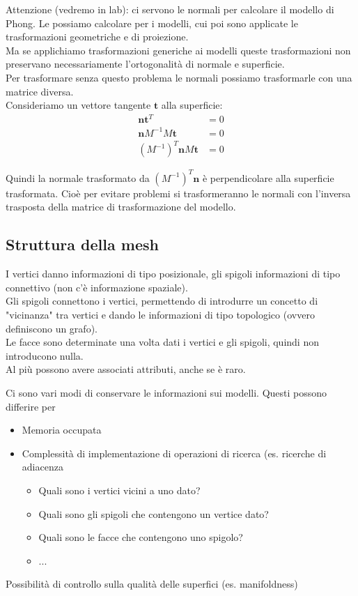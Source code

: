 \documentclass[a4paper, 10pt]{article}
\renewcommand{\vec}{\bm}
\begin{document}
		Attenzione (vedremo in lab): ci servono le normali per
		calcolare il modello di Phong. Le possiamo calcolare per i
		modelli, cui poi sono applicate le trasformazioni geometriche e
		di proiezione.\\
		Ma se applichiamo trasformazioni generiche ai modelli queste
		trasformazioni non preservano necessariamente l'ortogonalità
		di normale e superficie.\\
		Per trasformare senza questo problema le normali possiamo
		trasformarle con una matrice diversa.\\
		Consideriamo un vettore tangente $ \vec{t} $ alla superficie:
		\begin{align*}
			\vec{n}\vec{t}^T &= 0 \\
			\vec{n} M^{-1} M\vec{t} &= 0 \\
			(M^{-1})^T \vec{n} M\vec{t} &= 0
		\end{align*}
		
		Quindi la normale trasformato da $ (M^{-1})^T\vec{n} $ è perpendicolare alla
		superficie trasformata. Cioè per evitare problemi si
		trasformeranno le normali con l'inversa trasposta della matrice
		di trasformazione del modello.
		
	\subsection{Struttura della mesh}
		I vertici danno informazioni di tipo posizionale, gli spigoli
		informazioni di tipo connettivo (non c'è informazione spaziale).\\
		Gli spigoli connettono i vertici, permettendo di introdurre un
		concetto di "vicinanza" tra vertici e dando le informazioni di
		tipo topologico (ovvero definiscono un grafo).\\
		Le facce sono determinate una volta dati i vertici e gli spigoli,
		quindi non introducono nulla.\\
		Al più possono avere associati attributi, anche se è raro.\\
		
		\bigskip
		
		Ci sono vari modi di conservare le informazioni sui modelli.
		Questi possono differire per
		\begin{itemize}
			\item Memoria occupata
			\item Complessità di implementazione di operazioni di ricerca (es. ricerche
			di adiacenza
			\begin{itemize}
				\item Quali sono i vertici vicini a uno dato?
				\item Quali sono gli spigoli che contengono un vertice dato?
				\item Quali sono le facce che contengono uno spigolo?
				\item ...
			\end{itemize}
		\end{itemize}
		Possibilità di controllo sulla qualità delle superfici (es. manifoldness)
		
\end{document}

